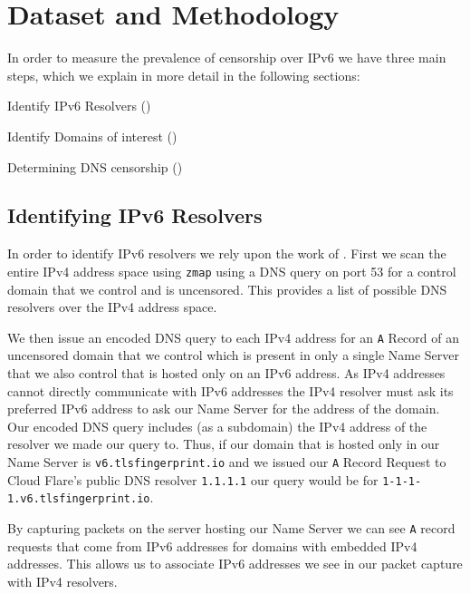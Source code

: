 \section{Dataset and Methodology}\label{sec:methodology}

In order to measure the prevalence of censorship over IPv6 we have three main
steps, which we explain in more detail in the following sections:
\begin{packed_enumerate}
    \item Identify IPv6 Resolvers ()
    \item Identify Domains of interest ()
    \item Determining DNS censorship ()
\end{packed_enumerate}


\subsection{Identifying IPv6 Resolvers}\label{ssec:ipv6-resolvers} 

In order to identify IPv6 resolvers we rely upon the work of
. First we scan the entire IPv4 address space using
\texttt{zmap} using a DNS query on port 53 for a control domain that
we control and is uncensored. This provides a list of possible
DNS resolvers over the IPv4 address space. 

We then issue an encoded DNS query to each IPv4 address for an \texttt{A} Record
of an uncensored domain that we control which is present in only a single Name
Server that we also control that is hosted only on an IPv6 address. As IPv4
addresses cannot directly communicate with IPv6 addresses the IPv4 resolver must
ask its preferred IPv6 address to ask our Name Server for the address of the
domain. Our encoded DNS query includes (as a subdomain) the IPv4 address of the
resolver we made our query to. Thus, if our domain that is hosted only in our
Name Server is \texttt{v6.tlsfingerprint.io} and we issued our \texttt{A} Record
Request to Cloud Flare's public DNS resolver \texttt{1.1.1.1} our query would be
for \texttt{1-1-1-1.v6.tlsfingerprint.io}.

By capturing packets on the server hosting our Name Server we can see \texttt{A}
record requests that come from IPv6 addresses for domains with embedded IPv4
addresses. This allows us to associate IPv6 addresses we see in our packet
capture with IPv4 resolvers.

